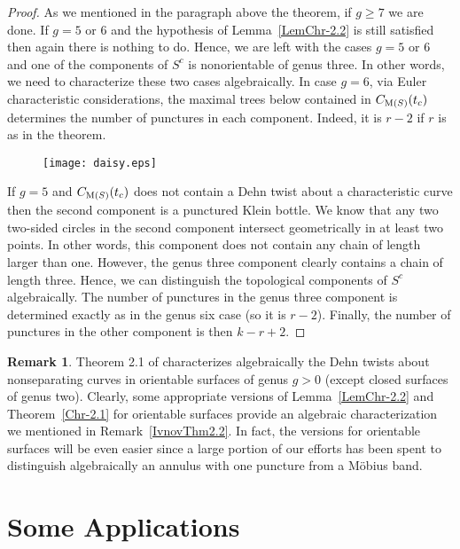 \documentclass[11 pt]{amsart}
\theoremstyle{definition}
\newtheorem{Remark}[Theorem]{Remark}
\begin{document}
\begin{proof}
As we mentioned in the paragraph above the theorem, if $g\geq 7$ we
are done. If $g=5$ or $6$ and the hypothesis of
Lemma~\ref{LemChr-2.2} is still satisfied then again there is
nothing to do. Hence, we are left with the cases $g=5$ or $6$ and
one of the components of $S^c$ is nonorientable of genus three.  In
other words, we need to characterize these two cases algebraically.
In case $g=6$, via Euler characteristic considerations, the maximal
trees below contained in $C_{{\rm M}(S)}(t_c)$ determines the number
of punctures in each component.  Indeed, it is $r-2$ if $r$ is as in
the theorem.

\begin{figure}[hbt]
 \begin{center}
 \texttt{[image: daisy.eps]}
\caption {} \label{daisy}
\end{center}
\end{figure}

If $g=5$ and $C_{{\rm M}(S)}(t_c)$ does not contain a Dehn twist
about a characteristic curve then the second component is a
punctured Klein bottle. We know that any two two-sided circles in
the second component intersect geometrically in at least two points.
In other words, this component does not contain any chain of length
larger than one. However, the genus three component clearly contains
a chain of length three. Hence, we can distinguish the topological
components of $S^c$ algebraically. The number of punctures in the
genus three component is determined exactly as in the genus six case
(so it is $r-2$).  Finally, the number of punctures in the other
component is then $k-r+2$.
\end{proof}

\begin{Remark}\label{Rem-GeneralDehnTwistCh}
Theorem 2.1 of \cite{I1} characterizes algebraically the Dehn twists
about nonseparating curves in orientable surfaces of genus $g>0$
(except closed surfaces of genus two). Clearly, some appropriate
versions of Lemma~\ref{LemChr-2.2} and Theorem~\ref{Chr-2.1} for
orientable surfaces provide an algebraic characterization we
mentioned in Remark~\ref{IvnovThm2.2}. In fact, the versions for
orientable surfaces will be even easier since a large portion of our
efforts has been spent to distinguish algebraically an annulus with
one puncture from a M\"obius band.
\end{Remark}

\section{Some Applications}
\end{document}

